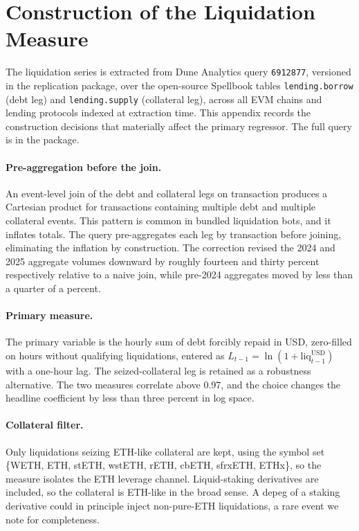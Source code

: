 \section{Construction of the Liquidation Measure}
\label{app:data}

The liquidation series is extracted from Dune Analytics query
\texttt{6912877}, versioned in the replication package, over the
open-source Spellbook tables \texttt{lending.borrow} (debt leg) and
\texttt{lending.supply} (collateral leg), across all EVM chains and lending
protocols indexed at extraction time. This appendix records the
construction decisions that materially affect the primary regressor. The
full query is in the package.

\paragraph{Pre-aggregation before the join.}
An event-level join of the debt and collateral legs on transaction produces
a Cartesian product for transactions containing multiple debt and multiple
collateral events. This pattern is common in bundled liquidation bots, and it
inflates totals. The query pre-aggregates each leg by transaction before
joining, eliminating the inflation by construction. The correction revised
the 2024 and 2025 aggregate volumes downward by roughly fourteen and thirty
percent respectively relative to a naive join, while pre-2024 aggregates
moved by less than a quarter of a percent.

\paragraph{Primary measure.}
The primary variable is the hourly sum of debt forcibly repaid in USD,
zero-filled on hours without qualifying liquidations, entered as
$L_{t-1} = \ln(1 + \text{liq}^{\text{USD}}_{t-1})$ with a one-hour lag. The
seized-collateral leg is retained as a robustness alternative. The two
measures correlate above 0.97, and the choice changes the headline
coefficient by less than three percent in log space.

\paragraph{Collateral filter.}
Only liquidations seizing ETH-like collateral are kept, using the symbol set
\{WETH, ETH, stETH, wstETH, rETH, cbETH, sfrxETH, ETHx\}, so the measure
isolates the ETH leverage channel. Liquid-staking derivatives are included,
so the collateral is ETH-like in the broad sense. A depeg of a staking
derivative could in principle inject non-pure-ETH liquidations, a rare
event we note for completeness.

